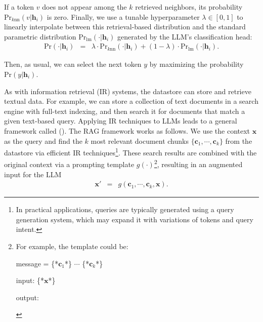 \noindent If a token $v$ does not appear among the $k$ retrieved neighbors, its probability $\mathrm{Pr}_{k\mathrm{nn}}(v|\mathbf{h}_i)$ is zero. Finally, we use a tunable hyperparameter $\lambda \in [0,1]$ to linearly interpolate between this retrieval-based distribution and the standard parametric distribution $\mathrm{Pr}_{\mathrm{lm}}(\cdot|\mathbf{h}_i)$ generated by the LLM's classification head:
\begin{eqnarray}
\mathrm{Pr}(\cdot|\mathbf{h}_i) & = & \lambda \cdot \mathrm{Pr}_{k\mathrm{nn}}(\cdot|\mathbf{h}_i) + (1 - \lambda) \cdot \mathrm{Pr}_{\mathrm{lm}}(\cdot|\mathbf{h}_i).
\end{eqnarray}

\noindent Then, as usual, we can select the next token $y$ by maximizing the probability $\mathrm{Pr}(y|\mathbf{h}_i)$.

As with information retrieval (IR) systems, the datastore can store and retrieve textual data. For example, we can store a collection of text documents in a search engine with full-text indexing, and then search it for documents that match a given text-based query. Applying IR techniques to LLMs leads to a general framework called  (). The RAG framework works as follows. We use the context $\mathbf{x}$ as the query and find the $k$ most relevant document chunks $\{\mathbf{c}_{1},\cdots,\mathbf{c}_{k}\}$ from the datastore via efficient IR techniques\footnote{In practical applications, queries are typically generated using a query generation system, which may expand it with variations of tokens and query intent.}. These search results are combined with the original context via a prompting template $g(\cdot)$\footnote{For example, the template could be:

\vspace{0.3em}
\begin{tcolorbox}
\begin{center}
\parbox{0.9\textwidth}
{

\hspace{4em} message = \{*$\mathbf{c}_1$*\} $\cdots$ \{*$\mathbf{c}_k$*\}

\vspace{0.3em}

\hspace{4em} input: \{*$\mathbf{x}$*\}

\vspace{0.3em}

\hspace{4em} output: \underline{\hspace{2em}}

}
\end{center}
\end{tcolorbox}

}, resulting in an augmented input for the LLM
\begin{eqnarray}
\mathbf{x}' & = & g(\mathbf{c}_{1},\cdots,\mathbf{c}_{k},\mathbf{x}).
\end{eqnarray}


